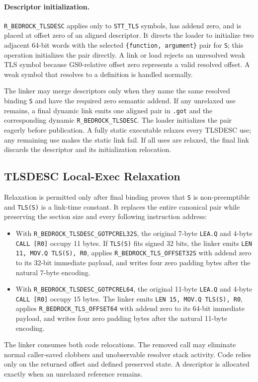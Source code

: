 \documentclass[10pt,twoside]{article}
\begin{document}
\paragraph{Descriptor initialization.}
\texttt{R\_BEDROCK\_TLSDESC} applies only to \texttt{STT\_TLS} symbols, has
addend zero, and is placed at offset zero of an aligned descriptor. It directs
the loader to initialize two adjacent 64-bit words with the selected
\texttt{\{function, argument\}} pair for \texttt{S}; this operation initializes
the pair directly. A link or load rejects an unresolved weak TLS symbol because
GS0-relative offset zero represents a valid resolved offset. A weak symbol that resolves to a definition is
handled normally.

The linker may merge descriptors only when they name the same resolved binding
\texttt{S} and have the required zero semantic addend. If any unrelaxed use
remains, a final dynamic link emits one aligned pair in \texttt{.got} and the
corresponding dynamic \texttt{R\_BEDROCK\_TLSDESC}. The loader initializes the
pair eagerly before publication. A fully static executable relaxes every
TLSDESC use; any remaining use makes the static link fail. If all uses are
relaxed, the final link discards the descriptor and its initialization
relocation.

\subsection{TLSDESC Local-Exec Relaxation}
Relaxation is permitted only after final binding proves that \texttt{S} is
non-preemptible and \texttt{TLS(S)} is a link-time constant. It replaces the
entire canonical pair while preserving the section size and every following
instruction address:
\begin{itemize}\raggedright
\item With \texttt{R\_BEDROCK\_TLSDESC\_GOTPCREL32S}, the original
      7-byte \texttt{LEA.Q} and 4-byte \texttt{CALL [R0]} occupy 11 bytes. If
      \texttt{TLS(S)} fits signed 32 bits, the linker emits
      \texttt{LEN 11, MOV.Q TLS(S), R0}, applies
      \texttt{R\_BEDROCK\_TLS\_OFFSET32S} with addend zero to its 32-bit
      immediate payload, and writes four zero padding bytes after the natural
      7-byte encoding.
\item With \texttt{R\_BEDROCK\_TLSDESC\_GOTPCREL64}, the original
      11-byte \texttt{LEA.Q} and 4-byte \texttt{CALL [R0]} occupy 15 bytes. The
      linker emits \texttt{LEN 15, MOV.Q TLS(S), R0}, applies
      \texttt{R\_BEDROCK\_TLS\_OFFSET64} with addend zero to its 64-bit
      immediate payload, and writes four zero padding bytes after the natural
      11-byte encoding.
\end{itemize}
The linker consumes both code relocations. The removed call may eliminate
normal caller-saved clobbers and unobservable resolver stack activity. Code
relies only on the returned offset and defined preserved state. A descriptor
is allocated exactly when an unrelaxed reference remains.
\end{document}
